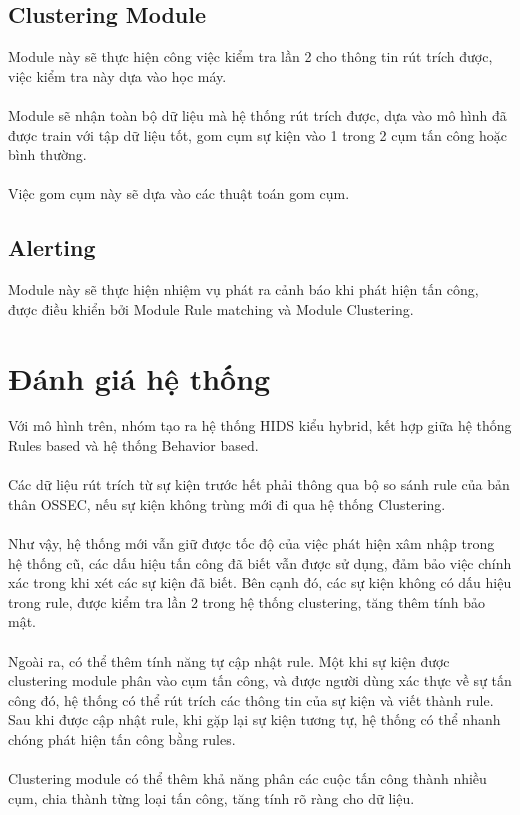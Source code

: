    \subsection{Clustering Module}
   Module này sẽ thực hiện công việc kiểm tra lần 2 cho thông tin rút trích
   được, việc kiểm tra này dựa vào học máy.\\\\
   Module sẽ nhận toàn bộ dữ liệu mà hệ thống rút trích được, dựa vào mô hình đã
   được train với tập dữ liệu tốt, gom cụm sự kiện vào 1 trong 2 cụm tấn công
   hoặc bình thường.\\\\
   Việc gom cụm này sẽ dựa vào các thuật toán gom cụm.
   \subsection{Alerting}
   Module này sẽ thực hiện nhiệm vụ phát ra cảnh báo khi phát hiện tấn công,
   được điều khiển bởi Module Rule matching và Module Clustering.
\section{Đánh giá hệ thống}
  Với mô hình trên, nhóm tạo ra hệ thống HIDS kiểu hybrid, kết hợp giữa hệ
thống Rules based và hệ thống Behavior based.\\\\ 
Các dữ liệu rút trích từ sự kiện trước hết phải thông qua
bộ so sánh rule của bản thân OSSEC, nếu sự kiện không trùng mới đi qua hệ
thống Clustering. \\\\
Như vậy, hệ thống mới vẫn giữ được tốc độ của việc phát
hiện xâm nhập trong hệ thống cũ, các dấu hiệu tấn công đã biết vẫn được sử dụng, đảm bảo
việc chính xác trong khi xét các sự kiện đã biết. Bên cạnh đó, các sự kiện không
có dấu hiệu trong rule, được kiểm tra lần 2 trong hệ thống clustering, tăng
thêm tính bảo mật.\\\\  
Ngoài ra, có thể thêm tính năng tự cập nhật rule. Một khi sự kiện được
clustering module phân vào cụm tấn công, và được người dùng xác thực về sự
tấn công đó, hệ thống có thể rút trích các thông tin của sự kiện và viết thành
rule. Sau khi được cập nhật rule, khi gặp lại sự kiện tương tự, hệ thống có thể
nhanh chóng phát hiện tấn công bằng rules.\\\\ 
Clustering module có thể thêm khả năng phân các cuộc tấn công thành nhiều cụm,
chia thành từng loại tấn công, tăng tính rõ ràng cho dữ liệu.